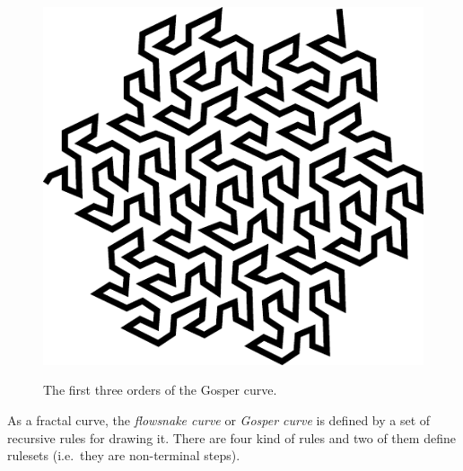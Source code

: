 \documentclass[12pt,openany,a4,usenames,dvipsnames]{book}
\begin{document}
\begin{figure}[H]
\begin{minipage}{\textwidth}
\begin{minipage}{0.30\textwidth}
    \hfill
  \end{minipage}
  \hspace{0.028\textwidth}
  \begin{minipage}{0.30\textwidth}
    \hfill
    \includegraphics[width=\textwidth,keepaspectratio]{figures/gosper3.pdf}
    \hfill
  \end{minipage}
  \end{minipage}\par
  \vspace{1em}
  {\noindent{}The first three orders of the Gosper curve.}
\end{figure}
As a fractal curve, the \emph{flowsnake curve} or \emph{Gosper curve} is defined by a set of recursive rules for drawing it. There are four kind of rules and two of them define rulesets (i.e.\ they are non-terminal steps).
\end{document}
